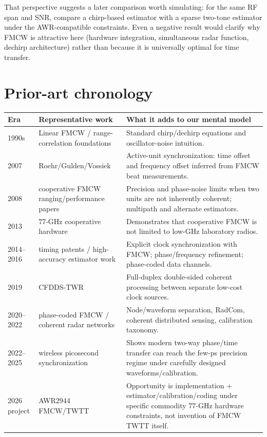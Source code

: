 \documentclass[11pt]{article}
\begin{document}
That perspective suggests a later comparison worth simulating: for the same RF span and SNR, compare a chirp-based estimator with a sparse two-tone estimator under the AWR-compatible constraints. Even a negative result would clarify why FMCW is attractive here (hardware integration, simultaneous radar function, dechirp architecture) rather than because it is universally optimal for time transfer.

\section{Prior-art chronology}
\begin{longtable}{p{}p{}p{}}
\toprule Era & Representative work & What it adds to our mental model \\ \midrule
1990s & Linear FMCW / range-correlation foundations & Standard chirp/dechirp equations and oscillator-noise intuition. \\
2007 & Roehr/Gulden/Vossiek & Active-unit synchronization: time offset and frequency offset inferred from FMCW beat measurements. \\
2008 & cooperative FMCW ranging/performance papers & Precision and phase-noise limits when two units are not inherently coherent; multipath and alternate estimators. \\
2013 & 77-GHz cooperative hardware & Demonstrates that cooperative FMCW is not limited to low-GHz laboratory radios. \\
2014--2016 & timing patents / high-accuracy estimator work & Explicit clock synchronization with FMCW; phase/frequency refinement; phase-coded data channels. \\
2019 & CFDDS-TWR & Full-duplex double-sided coherent processing between separate low-cost clock sources. \\
2020--2022 & phase-coded FMCW / coherent radar networks & Node/waveform separation, RadCom, coherent distributed sensing, calibration taxonomy. \\
2022--2025 & wireless picosecond synchronization & Shows modern two-way phase/time transfer can reach the few-ps precision regime under carefully designed waveforms/calibration. \\
2026 project & AWR2944 FMCW/TWTT & Opportunity is implementation + estimator/calibration/coding under specific commodity 77-GHz hardware constraints, not invention of FMCW TWTT itself. \\
\bottomrule
\end{longtable}
\end{document}
